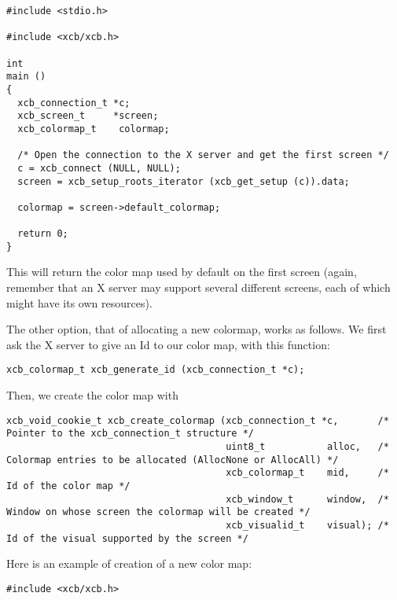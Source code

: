 \documentclass[12pt,oneside,titlepage]{book}
\begin{document}
\begin{enumerate}
\begin{enumerate}
\begin{verbatim}
#include <stdio.h>

#include <xcb/xcb.h>

int
main ()
{
  xcb_connection_t *c;
  xcb_screen_t     *screen;
  xcb_colormap_t    colormap;

  /* Open the connection to the X server and get the first screen */
  c = xcb_connect (NULL, NULL);
  screen = xcb_setup_roots_iterator (xcb_get_setup (c)).data;

  colormap = screen->default_colormap;

  return 0;
}
\end{verbatim}

    This will return the color map used by default on the first screen
    (again, remember that an X server may support several different
    screens, each of which might have its own resources).

    The other option, that of allocating a new colormap, works as
    follows. We first ask the X server to give an Id to our color map,
    with this function:

\begin{verbatim}
xcb_colormap_t xcb_generate_id (xcb_connection_t *c);
\end{verbatim}

    Then, we create the color map with

\begin{verbatim}
xcb_void_cookie_t xcb_create_colormap (xcb_connection_t *c,       /* Pointer to the xcb_connection_t structure */
                                       uint8_t           alloc,   /* Colormap entries to be allocated (AllocNone or AllocAll) */
                                       xcb_colormap_t    mid,     /* Id of the color map */
                                       xcb_window_t      window,  /* Window on whose screen the colormap will be created */
                                       xcb_visualid_t    visual); /* Id of the visual supported by the screen */
\end{verbatim}

    Here is an example of creation of a new color map:

\begin{verbatim}
#include <xcb/xcb.h>


\end{verbatim}
\end{enumerate}
\end{enumerate}
\end{document}
